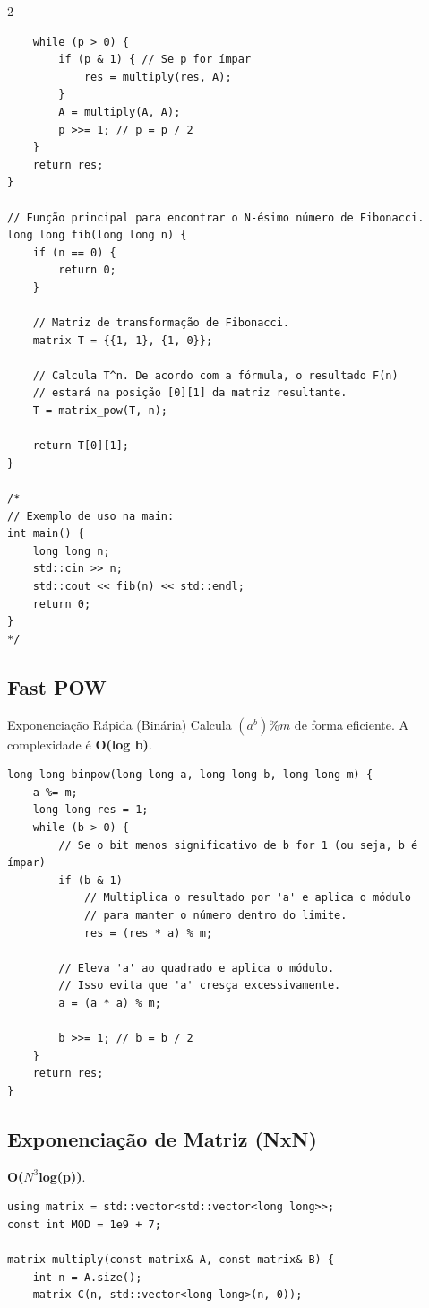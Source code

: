 \documentclass[11pt]{article}
\begin{document}
\begin{multicols}{2}
\begin{lstlisting}
    while (p > 0) {
        if (p & 1) { // Se p for ímpar
            res = multiply(res, A);
        }
        A = multiply(A, A);
        p >>= 1; // p = p / 2
    }
    return res;
}

// Função principal para encontrar o N-ésimo número de Fibonacci.
long long fib(long long n) {
    if (n == 0) {
        return 0;
    }

    // Matriz de transformação de Fibonacci.
    matrix T = {{1, 1}, {1, 0}};
    
    // Calcula T^n. De acordo com a fórmula, o resultado F(n)
    // estará na posição [0][1] da matriz resultante.
    T = matrix_pow(T, n);
    
    return T[0][1];
}

/*
// Exemplo de uso na main:
int main() {
    long long n;
    std::cin >> n;
    std::cout << fib(n) << std::endl;
    return 0;
}
*/
\end{lstlisting}

\subsection{Fast POW}
Exponenciação Rápida (Binária) Calcula $(a^b)\%m$ de forma eficiente. A complexidade é \textbf{O(log b)}.
\begin{lstlisting}
long long binpow(long long a, long long b, long long m) {
    a %= m;
    long long res = 1;
    while (b > 0) {
        // Se o bit menos significativo de b for 1 (ou seja, b é ímpar)
        if (b & 1)
            // Multiplica o resultado por 'a' e aplica o módulo
            // para manter o número dentro do limite.
            res = (res * a) % m;
        
        // Eleva 'a' ao quadrado e aplica o módulo.
        // Isso evita que 'a' cresça excessivamente.
        a = (a * a) % m;
        
        b >>= 1; // b = b / 2
    }
    return res;
}
\end{lstlisting}

\subsection{Exponenciação de Matriz (NxN)}
\textbf{O($N^3$log(p))}.
\begin{lstlisting}
using matrix = std::vector<std::vector<long long>>;
const int MOD = 1e9 + 7;

matrix multiply(const matrix& A, const matrix& B) {
    int n = A.size();
    matrix C(n, std::vector<long long>(n, 0)); 
    

\end{lstlisting}
\end{multicols}
\end{document}

